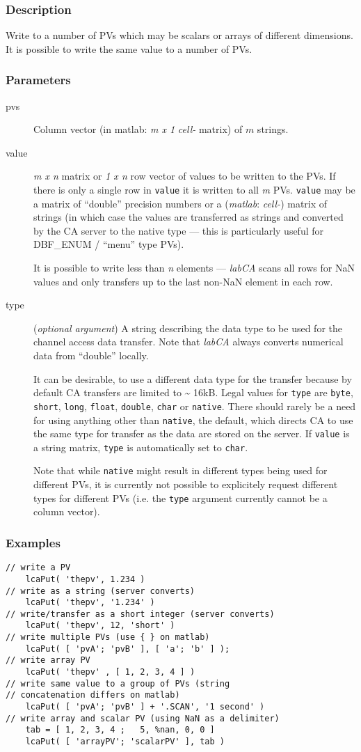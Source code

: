 \documentclass{article}
\newcommand{\sca}{\ita{labCA}}
\newcommand{\matlab}{\ita{matlab}}
\newcommand{\com}[1]{{\tt #1}}
\newcommand{\NAN}{\mbox{NaN}}
\newcommand{\ita}[1]{\emph{#1}}
\newcommand{\m}{$m$}
\newcommand{\mhack}{$m$} %
\newcommand{\n}{$n$}
\newcommand{\mxn}{$m\times n$}
\newcommand{\mxl}{$m\times 1$}
\newcommand{\lxn}{$1\times n$}
\newcommand{\calimit}{$\approx 16$kB}
\renewcommand{\m}{\ita{m}}
\newcommand{\mhack}{\ita{m}} %
\renewcommand{\n}{\ita{n}}
\renewcommand{\mxn}{\ita{m x n}}
\renewcommand{\mxl}{\ita{m x 1}}
\renewcommand{\lxn}{\ita{1 x n}}
\renewcommand{\calimit}{\~{} 16kB}
\newcommand{\PVITEM}{
\item[pvs] Column vector (in matlab: \mxl{} \ita{cell-} matrix)
of \mhack{} strings.
}
\begin{document}
\subsubsection{Description}
Write to a number of PVs which may be scalars or arrays of different
dimensions. It is possible to write the same value to a number of PVs.
\subsubsection{Parameters}
\begin{description}
\PVITEM
%
%
\item[value] \mxn{} matrix or \lxn{} row vector of values
to be written to the PVs. If there is only a single row in \com{value}{}
it is written to all \m{} PVs. \com{value} may be a matrix of ``double''
precision numbers or  a (\matlab: \ita{cell-}) matrix of strings (in
which case the values are transferred as strings and converted by the
CA server to the native type --- this is particularly useful for
DBF\_ENUM / ``menu'' type PVs).

It is possible to write less than \n{} elements --- \sca{} scans all rows
for \NAN{} values and only transfers up to the last non-\NAN{} element in each
row.
%
%
\item[type] (\ita{optional argument}) A string describing the
data type to be used for the channel access data transfer. Note
that \sca{} always converts numerical data from ``double'' locally.

It can be desirable, to use a different data type for the
transfer because by default CA transfers are limited to \calimit.
Legal values for \com{type}{} are \com{byte}, \com{short}, \com{long},
\com{float}, \com{double}, \com{char} or \com{native}. There should rarely
be a need for using anything other than \com{native}, the default,
which directs CA to use the same type for transfer as the data are
stored on the server. If \com{value} is a string matrix, \com{type}
is automatically set to \com{char}.

Note that while \com{native}{} might result in different types
being used for different PVs, it is currently not possible to
explicitely request different types for different PVs (i.e. the
\com{type}{} argument currently cannot be a column vector).
%
\end{description}
\subsubsection{Examples}
\begin{verbatim}
// write a PV
    lcaPut( 'thepv', 1.234 )
// write as a string (server converts)
    lcaPut( 'thepv', '1.234' )
// write/transfer as a short integer (server converts)
    lcaPut( 'thepv', 12, 'short' )
// write multiple PVs (use { } on matlab)
    lcaPut( [ 'pvA'; 'pvB' ], [ 'a'; 'b' ] );
// write array PV
    lcaPut( 'thepv' , [ 1, 2, 3, 4 ] )
// write same value to a group of PVs (string
// concatenation differs on matlab)
    lcaPut( [ 'pvA'; 'pvB' ] + '.SCAN', '1 second' )
// write array and scalar PV (using NaN as a delimiter)
    tab = [ 1, 2, 3, 4 ;   5, %nan, 0, 0 ]
	lcaPut( [ 'arrayPV'; 'scalarPV' ], tab )
\end{verbatim}
\end{document}
